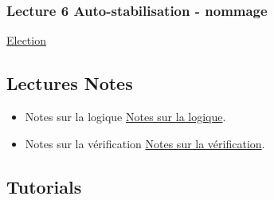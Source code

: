 \documentclass[ 12pt]{article}
\begin{document}
\subsubsection{Lecture 6 Auto-stabilisation - nommage}
  
\href{http://mery54.github.io/teaching/aspd/lecturesnotes/ASPD6.pdf}{Election}



  \subsection{Lectures Notes}

  \begin{itemize}
  \item[]   Notes sur la logique
    \href{http://mery54.github.io/teaching/movex/lecturesnotes/preprint-chapterlogique.pdf}{Notes sur la logique}.

     \item[]   Notes sur la vérification
    \href{http://mery54.github.io/teaching/movex/lecturesnotes/preprint-chapterverification.pdf}{Notes sur la vérification}.

  \end{itemize}


  

\subsection{Tutorials}
\end{document}
